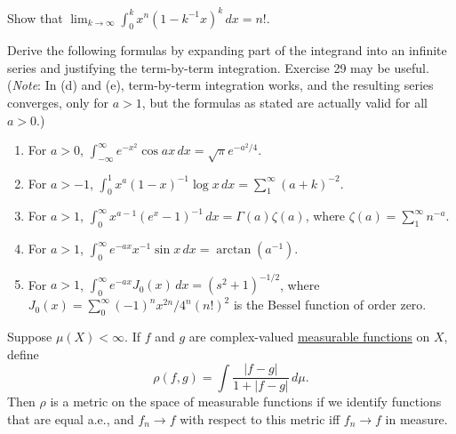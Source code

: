 	\begin{exercise}[Folland 2.30]
		Show that $\lim_{k \to \infty} \int_0^k x^n (1 - k^{-1}x)^k \, dx = n!$.
	\end{exercise}
	\begin{solution}

	\end{solution}

	\begin{exercise}[Folland 2.31]
		Derive the following formulas by expanding part of the integrand into an infinite series and justifying the term-by-term integration. Exercise 29 may be useful. (\textit{Note}: In (d) and (e), term-by-term integration works, and the resulting series converges, only for $a > 1$, but the formulas as stated are actually valid for all $a > 0$.)
		\begin{enumerate}[label=\textbf{\alph*.}]
			\item For $a > 0$, $\int_{-\infty}^\infty e^{-x^2} \cos ax \, dx = \sqrt{\pi} e^{-a^2/4}$.
			\item For $a > -1$, $\int_0^1 x^a (1 - x)^{-1} \log x \, dx = \sum_1^\infty (a + k)^{-2}$.
			\item For $a > 1$, $\int_0^\infty x^{a-1} (e^x - 1)^{-1} \, dx = \Gamma(a)\zeta(a)$, where $\zeta(a) = \sum_1^\infty n^{-a}$.
			\item For $a > 1$, $\int_0^\infty e^{-ax} x^{-1} \sin x \, dx = \arctan(a^{-1})$.
			\item For $a > 1$, $\int_0^\infty e^{-ax} J_0(x) \, dx = (s^2 + 1)^{-1/2}$, where $J_0(x) = \sum_0^\infty (-1)^n x^{2n} / 4^n (n!)^2$ is the Bessel function of order zero.
		\end{enumerate}
	\end{exercise}
	\begin{solution}

	\end{solution}

	\begin{exercise}[Folland 2.32]
		Suppose $\mu(X) < \infty$. If $f$ and $g$ are complex-valued \hyperref[def:measurable-function]{measurable functions} on $X$, define
		\begin{equation}
			\rho(f, g) = \int \frac{|f - g|}{1 + |f - g|} \, d\mu.
		\end{equation}
		Then $\rho$ is a metric on the space of measurable functions if we identify functions that are equal a.e., and $f_n \to f$ with respect to this metric iff $f_n \to f$ in measure.
	\end{exercise}
	\begin{solution}

	\end{solution}

